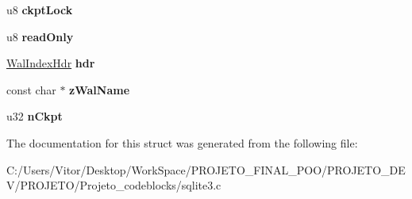 \begin{DoxyCompactItemize}
\item 
\hypertarget{struct_wal_a29153bfb37a9a32f1171e5c1d10994d2}{u8 {\bfseries ckpt\-Lock}}\label{struct_wal_a29153bfb37a9a32f1171e5c1d10994d2}

\item 
\hypertarget{struct_wal_a38f0810e34bdc89acdf27574473c0495}{u8 {\bfseries read\-Only}}\label{struct_wal_a38f0810e34bdc89acdf27574473c0495}

\item 
\hypertarget{struct_wal_adbeef9e632541fbf07c926652b165906}{\hyperlink{struct_wal_index_hdr}{Wal\-Index\-Hdr} {\bfseries hdr}}\label{struct_wal_adbeef9e632541fbf07c926652b165906}

\item 
\hypertarget{struct_wal_ac54961758701702d67eaf3ce15c69ea5}{const char $\ast$ {\bfseries z\-Wal\-Name}}\label{struct_wal_ac54961758701702d67eaf3ce15c69ea5}

\item 
\hypertarget{struct_wal_a8fbe9b014342db76d8167b518b70acad}{u32 {\bfseries n\-Ckpt}}\label{struct_wal_a8fbe9b014342db76d8167b518b70acad}

\end{DoxyCompactItemize}


The documentation for this struct was generated from the following file\-:\begin{DoxyCompactItemize}
\item 
C\-:/\-Users/\-Vitor/\-Desktop/\-Work\-Space/\-P\-R\-O\-J\-E\-T\-O\-\_\-\-F\-I\-N\-A\-L\-\_\-\-P\-O\-O/\-P\-R\-O\-J\-E\-T\-O\-\_\-\-D\-E\-V/\-P\-R\-O\-J\-E\-T\-O/\-Projeto\-\_\-codeblocks/sqlite3.\-c\end{DoxyCompactItemize}
